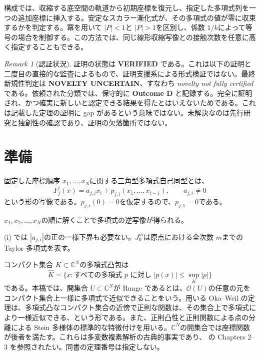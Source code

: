 \documentclass[12pt]{amsart}
\theoremstyle{definition}
\theoremstyle{remark}
\newtheorem{rem}[thm]{Remark}
\numberwithin{equation}{section}
\newcommand{\C}{\mathbb{C}}
\begin{document}
構成では、収縮する底空間の軌道から初期座標を復元し、指定した多項式列を一つの追加座標に挿入する。安定なスカラー漸化式が、その多項式の値が零に収束するかを判定する。冪を用いて \allowbreak$|P|<1$\allowbreak と \allowbreak$|P|>1$\allowbreak を区別し、係数 \allowbreak$1/k$\allowbreak によって等号の場合を制御する。この方法では、同じ線形収縮写像との接触次数を任意に高く指定することもできる。

\begin{rem}[認証状況]\label{rem:status-ja}
証明の状態は \textbf{VERIFIED} である。これは以下の証明と二度目の直接的な監査によるもので、証明支援系による形式検証ではない。最終新規性判定は \textbf{NOVELTY UNCERTAIN}、すなわち \emph{novelty not fully certified} である。依頼された分類では、保守的に \textbf{Outcome D} と記録する。完全に証明され、かつ確実に新しいと認定できる結果を得たとはいえないためである。これは記載した定理の証明に gap があるという意味ではない。未解決なのは先行研究と独創性の確認であり、証明の欠落箇所ではない。
\end{rem}

\section{準備}
固定した座標順序 \allowbreak$x_1,\ldots,x_N$\allowbreak に関する三角型多項式自己同型とは、
\begin{equation}\label{eq:triangular-ja}
F_j^i(x)=a_{j,i}x_i+p_{j,i}(x_1,\ldots,x_{i-1}),
\qquad a_{j,i}\ne0
\end{equation}
という形の写像である。\allowbreak$p_{j,i}(0)=0$\allowbreak を仮定するので、\allowbreak$p_{j,1}=0$\allowbreak である。

\allowbreak$x_1,x_2,\ldots,x_N$\allowbreak の順に解くことで多項式の逆写像が得られる。

(i) では \allowbreak$|a_{j,i}|$\allowbreak の正の一様下界も必要ない。\allowbreak$J_0^m$\allowbreak は原点における全次数 \allowbreak$m$\allowbreak までの Taylor 多項式を表す。

コンパクト集合 \allowbreak$K\subset\C^N$\allowbreak の多項式凸包は
\[
\widehat K=\{x: \text{すべての多項式 }p\text{ に対し }
|p(x)|\leq\sup_K|p|\}
\]
である。本稿では、開集合 \allowbreak$U\subset\C^N$\allowbreak が Runge であるとは、\allowbreak$\mathcal O(U)$\allowbreak の任意の元をコンパクト集合上一様に多項式で近似できることをいう。用いる Oka--Weil の定理は、多項式凸なコンパクト集合の近傍で正則な関数は、その集合上で多項式により一様近似できる、という形である。また、正則凸性と正則関数による点の分離による Stein 多様体の標準的な特徴付けを用いる。\allowbreak$\C^N$\allowbreak の開集合では座標関数が後者を満たす。これらは多変数複素解析の古典的事実であり、\cite{Forst-ja} の Chapters 2--3 を参照されたい。同書の定理番号は指定しない。
\end{document}
